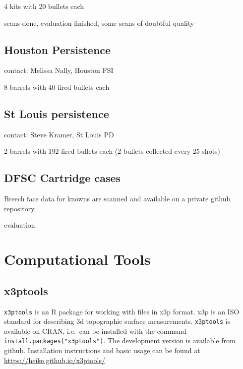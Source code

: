 \documentclass[]{book}
\begin{document}
4 kits with 20 bullets each

scans done, evaluation finished, some scans of doubtful quality

\hypertarget{houston-persistence}{%
\subsection{Houston Persistence}\label{houston-persistence}}

contact: Melissa Nally, Houston FSI

8 barrels with 40 fired bullets each

\hypertarget{st-louis-persistence}{%
\subsection{St Louis persistence}\label{st-louis-persistence}}

contact: Steve Kramer, St Louis PD

2 barrels with 192 fired bullets each (2 bullets collected every 25 shots)

\hypertarget{dfsc-cartridge-cases}{%
\subsection{DFSC Cartridge cases}\label{dfsc-cartridge-cases}}

Breech face data for knowns are scanned and available on a private github repository

evaluation

\hypertarget{computational-tools}{%
\section{Computational Tools}\label{computational-tools}}

\hypertarget{x3ptools}{%
\subsection{x3ptools}\label{x3ptools}}

\texttt{x3ptools} is an R package for working with files in x3p format. x3p is an ISO standard for describing 3d topographic surface measurements.
\texttt{x3ptools} is available on CRAN, i.e.~can be installed with the command \texttt{install.packages("x3ptools")}. The development version is available from github. Installation instructions and basic usage can be found at \url{https://heike.github.io/x3ptools/}
\end{document}
